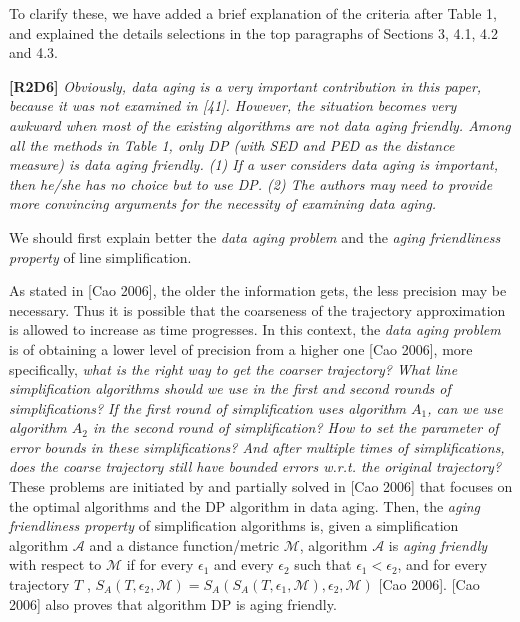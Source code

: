 \documentclass{letter}
\newcommand{\wrt}{\emph{w.r.t.}\xspace}
\begin{document}
To clarify these, we have added a brief explanation of the criteria after Table 1, and explained the details selections in the top paragraphs of Sections 3, 4.1, 4.2 and 4.3.

\textbf{[R2D6]} \emph{Obviously, data aging is a very important contribution in this paper, because it was not examined in [41]. However, the situation becomes very awkward when most of the existing algorithms are not data aging friendly. Among all the methods in Table 1, only DP (with SED and PED as the distance measure) is data aging friendly. (1) {If a user considers data aging is important, then he/she has no choice but to use DP}. (2) {The authors may need to provide more convincing arguments for the necessity of examining data aging}.}

We should first explain better the \emph{data aging problem} and the \emph{aging friendliness property} of line simplification.

As stated in [Cao 2006], the older the information gets, the less precision may be necessary. Thus it is possible that the coarseness of the trajectory approximation is allowed to increase as time progresses. In this context, the \emph{data aging problem} is of obtaining a lower level of precision from a higher one [Cao 2006], more specifically, \emph{what is the right way to get the coarser trajectory? What line simplification algorithms should we use in the first and second rounds of simplifications? If the first round of simplification uses algorithm $A_1$, can we use algorithm $A_2$ in the second round of simplification? How to set the parameter of error bounds in these simplifications? And after multiple times of simplifications, does the coarse trajectory still have bounded errors \wrt the original trajectory?} These problems are initiated by and partially solved in [Cao 2006] that focuses on the optimal algorithms and the DP algorithm in data aging.
Then, the \emph{aging friendliness property} of simplification algorithms is,  given a simplification algorithm $\mathcal{A}$ and a distance function/metric $\mathcal{M}$, algorithm $\mathcal{A}$ is \emph{aging friendly} with respect to  $\mathcal{M}$ if for every $\epsilon_1$ and every $\epsilon_2$ such that $\epsilon_1 <\epsilon_2$, and
for every trajectory $T$ , $S_A(T, \epsilon_2,\mathcal{M}) = S_A(S_A(T, \epsilon_1,\mathcal{M}), \epsilon_2, \mathcal{M})$ [Cao 2006]. [Cao 2006] also proves that algorithm DP is aging friendly.
\end{document}
